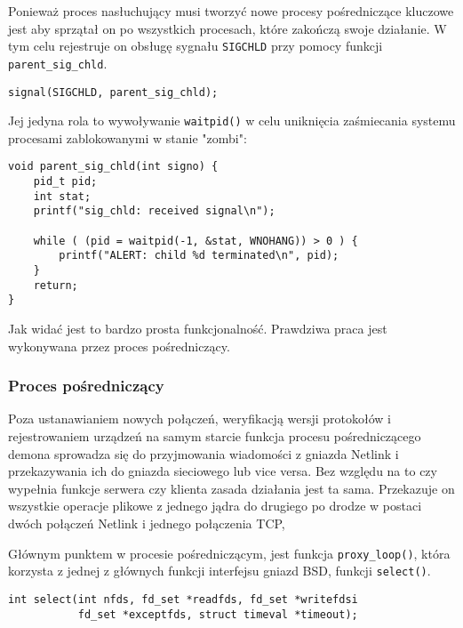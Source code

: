 \documentclass[10pt]{article}
\begin{document}
Ponieważ proces nasłuchujący musi tworzyć nowe procesy pośredniczące kluczowe jest aby sprzątał on po wszystkich procesach, które zakończą swoje działanie. W tym celu rejestruje on obsługę sygnału \texttt{SIGCHLD} przy pomocy funkcji \texttt{parent\_sig\_chld}.

\begin{verbatim}
signal(SIGCHLD, parent_sig_chld);
\end{verbatim}

Jej jedyna rola to wywoływanie \texttt{waitpid()} w celu uniknięcia zaśmiecania systemu procesami zablokowanymi w stanie "zombi":

\begin{verbatim}
void parent_sig_chld(int signo) {
    pid_t pid;
    int stat;
    printf("sig_chld: received signal\n");

    while ( (pid = waitpid(-1, &stat, WNOHANG)) > 0 ) {
        printf("ALERT: child %d terminated\n", pid);
    }
    return;
}
\end{verbatim}

Jak widać jest to bardzo prosta funkcjonalność. Prawdziwa praca jest wykonywana przez proces pośredniczący.

\subsubsection{Proces pośredniczący}

Poza ustanawianiem nowych połączeń, weryfikacją wersji protokołów i rejestrowaniem urządzeń na samym starcie funkcja procesu pośredniczącego demona sprowadza się do przyjmowania wiadomości z gniazda Netlink i przekazywania ich do gniazda sieciowego lub vice versa. Bez względu na to czy wypełnia funkcje serwera czy klienta zasada działania jest ta sama. Przekazuje on wszystkie operacje plikowe z jednego jądra do drugiego po drodze w postaci dwóch połączeń Netlink i jednego połączenia TCP,

Głównym punktem w procesie pośredniczącym, jest funkcja \texttt{proxy\_loop()}, która korzysta z jednej z głównych funkcji interfejsu gniazd BSD, funkcji \texttt{select()}.

\begin{verbatim}
int select(int nfds, fd_set *readfds, fd_set *writefdsi
           fd_set *exceptfds, struct timeval *timeout);
\end{verbatim}
\end{document}
